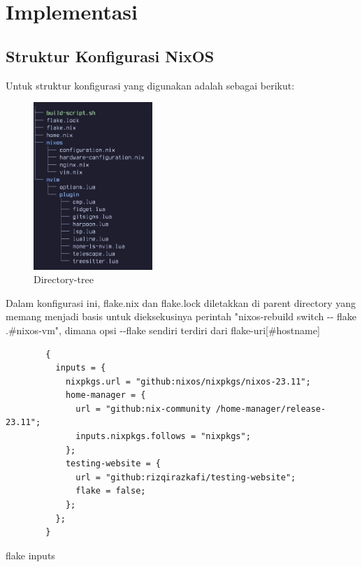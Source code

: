 \documentclass[10pt,]{report}
\newenvironment{code}{\captionsetup{type=listing}}{\vspace{3mm}}
\begin{document}
\section{Implementasi}
\begin{adjustwidth}{20pt}{}
	\subsection{Struktur Konfigurasi NixOS}
	\begin{adjustwidth}{20pt}{}
		\vspace{-3mm}
		Untuk struktur konfigurasi yang digunakan adalah sebagai berikut:
		\begin{figure}[H]
			\centering
			\includegraphics[width=0.4\textwidth]{images/directory-tree.png}
			\caption{Directory-tree}
		\end{figure}

		Dalam konfigurasi ini, flake.nix dan flake.lock diletakkan di parent
		directory yang memang menjadi basis untuk dieksekusinya perintah
		"nixos-rebuild switch -{}- flake .\#nixos-vm", dimana opsi -{}-flake sendiri
		terdiri dari flake-uri[\#hostname]

		\begin{code}
			\begin{verbatim}
        {
          inputs = {
            nixpkgs.url = "github:nixos/nixpkgs/nixos-23.11";
            home-manager = {
              url = "github:nix-community /home-manager/release-23.11";
              inputs.nixpkgs.follows = "nixpkgs";
            };
            testing-website = {
              url = "github:rizqirazkafi/testing-website";
              flake = false;
            };
          };
        }
      \end{verbatim}
			\caption{flake inputs}
		\end{code}



\end{adjustwidth}
\end{adjustwidth}
\end{document}
